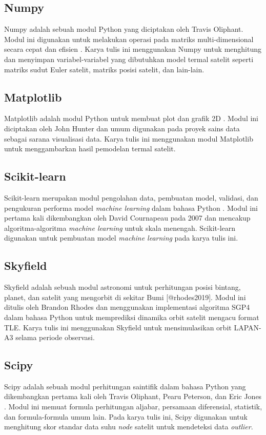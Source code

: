 \subsection{Numpy}

Numpy adalah sebuah modul Python yang diciptakan oleh Travis Oliphant. Modul
ini digunakan untuk melakukan operasi pada matriks multi-dimensional secara
cepat dan efisien \cite{harris2020}. Karya tulis ini menggunakan Numpy untuk
menghitung dan menyimpan variabel-variabel yang dibutuhkan model termal satelit
seperti matriks sudut Euler satelit, matriks posisi satelit, dan lain-lain. 

\subsection{Matplotlib}

Matplotlib adalah modul Python untuk membuat plot dan grafik 2D \cite{hunter2007}.
Modul ini diciptakan oleh John Hunter dan umum digunakan pada proyek sains data
sebagai sarana visualisasi data. Karya tulis ini menggunakan modul Matplotlib
untuk menggambarkan hasil pemodelan termal satelit.

\subsection{Scikit-learn}

Scikit-learn merupakan modul pengolahan data, pembuatan model, validasi, dan
pengukuran performa model \textit{machine learning} dalam bahasa Python \cite{pedregosa2011}.
Modul ini pertama kali dikembangkan oleh David Cournapeau pada 2007 dan
mencakup algoritma-algoritma \textit{machine learning} untuk skala menengah.
Scikit-learn digunakan untuk pembuatan model \textit{machine learning} pada karya tulis
ini.

\subsection{Skyfield}

Skyfield adalah sebuah modul astronomi untuk perhitungan posisi bintang,
planet, dan satelit yang mengorbit di sekitar Bumi [@rhodes2019]. Modul ini
ditulis oleh Brandon Rhodes dan menggunakan implementasi algoritma SGP4 dalam
bahasa Python \cite{rodriguez} untuk memprediksi dinamika orbit satelit mengacu
format TLE. Karya tulis ini menggunakan Skyfield untuk
mensimulasikan orbit LAPAN-A3 selama periode observasi.

\subsection{Scipy}

Scipy adalah sebuah modul perhitungan saintifik dalam bahasa Python yang
dikembangkan pertama kali oleh Travis Oliphant, Pearu Peterson, dan Eric Jones
\cite{virtanen2020}. Modul ini memuat formula perhitungan aljabar, persamaan
diferensial, statistik, dan formula-formula umum lain. Pada karya tulis ini,
Scipy digunakan untuk menghitung skor standar data suhu \textit{node} satelit
untuk mendeteksi data \textit{outlier}.
